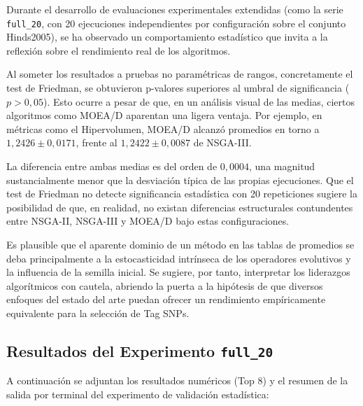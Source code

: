 \documentclass[a4paper,10pt]{article}
\begin{document}
Durante el desarrollo de evaluaciones experimentales extendidas (como la serie \texttt{full\_20}, con 20 ejecuciones independientes por configuración sobre el conjunto Hinds2005), se ha observado un comportamiento estadístico que invita a la reflexión sobre el rendimiento real de los algoritmos.

Al someter los resultados a pruebas no paramétricas de rangos, concretamente el test de Friedman, se obtuvieron p-valores superiores al umbral de significancia ($p > 0,05$). Esto ocurre a pesar de que, en un análisis visual de las medias, ciertos algoritmos como MOEA/D aparentan una ligera ventaja. Por ejemplo, en métricas como el Hipervolumen, MOEA/D alcanzó promedios en torno a $1,2426 \pm 0,0171$, frente al $1,2422 \pm 0,0087$ de NSGA-III.

La diferencia entre ambas medias es del orden de $0,0004$, una magnitud sustancialmente menor que la desviación típica de las propias ejecuciones. Que el test de Friedman no detecte significancia estadística con 20 repeticiones sugiere la posibilidad de que, en realidad, no existan diferencias estructurales contundentes entre NSGA-II, NSGA-III y MOEA/D bajo estas configuraciones.

Es plausible que el aparente dominio de un método en las tablas de promedios se deba principalmente a la estocasticidad intrínseca de los operadores evolutivos y la influencia de la semilla inicial. Se sugiere, por tanto, interpretar los liderazgos algorítmicos con cautela, abriendo la puerta a la hipótesis de que diversos enfoques del estado del arte puedan ofrecer un rendimiento empíricamente equivalente para la selección de Tag SNPs.

\subsection{Resultados del Experimento \texttt{full\_20}}

A continuación se adjuntan los resultados numéricos (Top 8) y el resumen de la salida por terminal del experimento de validación estadística:
\end{document}
